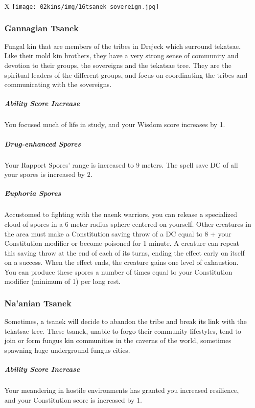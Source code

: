 \begin{linenumbers}
\begin{table*}[b]%
    \begin{DndTable}[width=\linewidth]{X}
        \texttt{[image: 02kins/img/16tsanek\_sovereign.jpg]}
    \end{DndTable}
\end{table*}

\subsubsection{Gannagian Tsanek}
Fungal kin that are members of the tribes in Drejeck which surround tekatsae.
Like their mold kin brothers, they have a very strong sense of community and devotion to their groups, the sovereigns and the tekatsae tree.
They are the spiritual leaders of the different groups, and focus on coordinating the tribes and communicating with the sovereigns.

\subparagraph{Ability Score Increase} You focused much of life in study, and your Wisdom score increases by 1.

\subparagraph{Drug-enhanced Spores} Your Rapport Spores' range is increased to 9 meters.
The spell save DC of all your spores is increased by 2.

\subparagraph{Euphoria Spores} Accustomed to fighting with the naenk warriors, you can release a specialized cloud of spores in a 6-meter-radius sphere centered on yourself.
Other creatures in the area must make a Constitution saving throw of a DC equal to 8 + your Constitution modifier or become poisoned for 1 minute.
A creature can repeat this saving throw at the end of each of its turns, ending the effect early on itself on a success.
When the effect ends, the creature gains one level of exhaustion.
You can produce these spores a number of times equal to your Constitution modifier (minimum of 1) per long rest.

\subsubsection{Na'anian Tsanek}
Sometimes, a tsanek will decide to abandon the tribe and break its link with the tekatsae tree.
These tsanek, unable to forgo their community lifestyles, tend to join or form fungus kin communities in the caverns of the world, sometimes spawning huge underground fungus cities.

\subparagraph{Ability Score Increase} Your meandering in hostile environments has granted you increased resilience, and your Constitution score is increased by 1.


\end{linenumbers}
